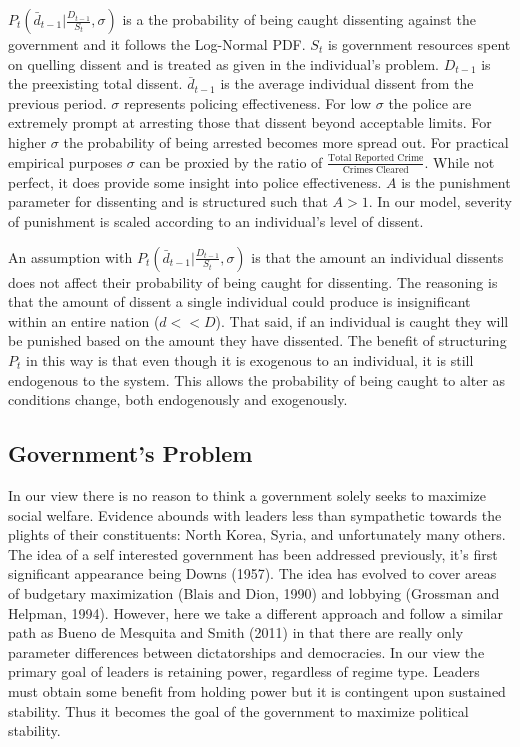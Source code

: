 \documentclass[12pt]{article}
\begin{document}
\begin{spacing}{1.5}
$ P_t \left( \bar{d}_{t-1} \Bigg|\frac{D_{t-1}}{S_t},\sigma \right)$ is a the probability of being caught dissenting against the government and it follows the Log-Normal PDF. $S_t$ is government resources spent on quelling dissent and is treated as given in the individual's problem. $D_{t-1}$ is the preexisting total dissent. $\bar{d}_{t-1}$ is the average individual dissent from the previous period. $\sigma$ represents policing effectiveness. For low $\sigma$ the police are extremely prompt at arresting those that dissent beyond acceptable limits. For higher $\sigma$ the probability of being arrested becomes more spread out. For practical empirical purposes $\sigma$ can be proxied by the ratio of $\frac{\text{Total Reported Crime}}{\text{Crimes Cleared}}$. While not perfect, it does provide some insight into police effectiveness. $A$ is the punishment parameter for dissenting and is structured such that $A>1$. In our model, severity of punishment is scaled according to an individual's level of dissent. 

An assumption with $P_t \left( \bar{d}_{t-1} \Bigg|\frac{D_{t-1}}{S_t},\sigma \right)$ is that the amount an individual dissents does not affect their probability of being caught for dissenting. The reasoning is that the amount of dissent a single individual could produce is insignificant within an entire nation ($d<<D$). That said, if an individual is caught they will be punished based on the amount they have dissented. The benefit of structuring $P_t$ in this way is that even though it is exogenous to an individual, it is still endogenous to the system. This allows the probability of being caught to alter as conditions change, both endogenously and exogenously.    

\subsection{Government's Problem} 

In our view there is no reason to think a government solely seeks to maximize social welfare.  Evidence abounds with leaders less than sympathetic towards the plights of their constituents: North Korea, Syria, and unfortunately many others. The idea of a self interested government has been addressed previously, it's first significant appearance being Downs (1957). The idea has evolved to cover areas of budgetary maximization (Blais and Dion, 1990) and lobbying (Grossman and Helpman, 1994). However, here we take a different approach and follow a similar path as Bueno de Mesquita and Smith (2011) in that there are really only parameter differences between dictatorships and democracies. In our view the primary goal of leaders is retaining power, regardless of regime type. Leaders must obtain some benefit from holding  power but it is contingent upon sustained stability. Thus it becomes the goal of the government to maximize political stability. 


\end{spacing}
\end{document}
